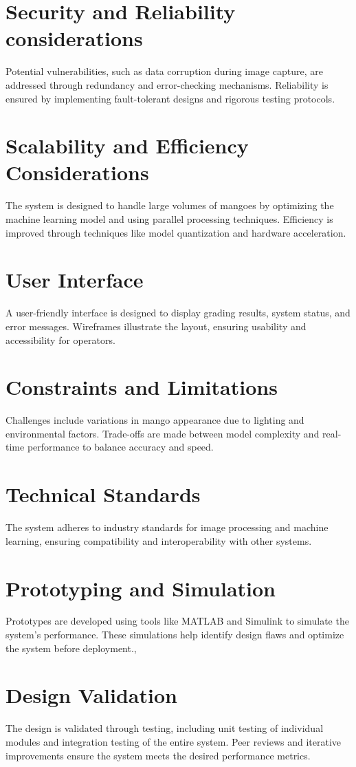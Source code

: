 \section{Security and Reliability considerations}
Potential vulnerabilities, such as data corruption during image capture, are addressed through redundancy and error-checking mechanisms. Reliability is ensured by implementing fault-tolerant designs and rigorous testing protocols.
\section{Scalability and Efficiency Considerations}
The system is designed to handle large volumes of mangoes by optimizing the machine learning model and using parallel processing techniques. Efficiency is improved through techniques like model quantization and hardware acceleration.
\section{User Interface}
A user-friendly interface is designed to display grading results, system status, and error messages. Wireframes illustrate the layout, ensuring usability and accessibility for operators.
\section{Constraints and Limitations}
Challenges include variations in mango appearance due to lighting and environmental factors. Trade-offs are made between model complexity and real-time performance to balance accuracy and speed.
\section{Technical Standards}
The system adheres to industry standards for image processing and machine learning, ensuring compatibility and interoperability with other systems.
\section{Prototyping and Simulation}
Prototypes are developed using tools like MATLAB and Simulink to simulate the system’s performance. These simulations help identify design flaws and optimize the system before deployment.,
\section{Design Validation}
The design is validated through testing, including unit testing of individual modules and integration testing of the entire system. Peer reviews and iterative improvements ensure the system meets the desired performance metrics.
